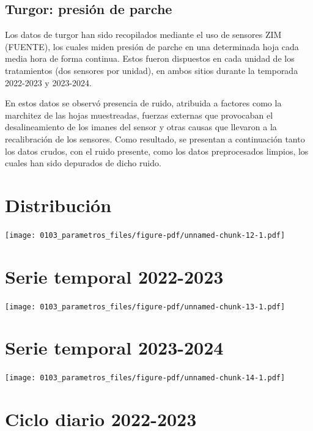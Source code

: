 \documentclass[
  letterpaper,
  DIV=11,
  numbers=noendperiod]{scrreprt}
\begin{document}
\section{Turgor: presión de parche}\label{sec-turgor}

Los datos de turgor han sido recopilados mediante el uso de sensores ZIM
(FUENTE), los cuales miden presión de parche en una determinada hoja
cada media hora de forma continua. Estos fueron dispuestos en cada
unidad de los tratamientos (dos sensores por unidad), en ambos sitios
durante la temporada 2022-2023 y 2023-2024.

En estos datos se observó presencia de ruido, atribuida a factores como
la marchitez de las hojas muestreadas, fuerzas externas que provocaban
el desalineamiento de los imanes del sensor y otras causas que llevaron
a la recalibración de los sensores. Como resultado, se presentan a
continuación tanto los datos crudos, con el ruido presente, como los
datos preprocesados limpios, los cuales han sido depurados de dicho
ruido.

\chapter{Distribución}

\begin{center}
\texttt{[image: 0103\_parametros\_files/figure-pdf/unnamed-chunk-12-1.pdf]}
\end{center}

\chapter{Serie temporal 2022-2023}

\begin{center}
\texttt{[image: 0103\_parametros\_files/figure-pdf/unnamed-chunk-13-1.pdf]}
\end{center}

\chapter{Serie temporal 2023-2024}

\begin{center}
\texttt{[image: 0103\_parametros\_files/figure-pdf/unnamed-chunk-14-1.pdf]}
\end{center}

\chapter{Ciclo diario 2022-2023}
\end{document}
